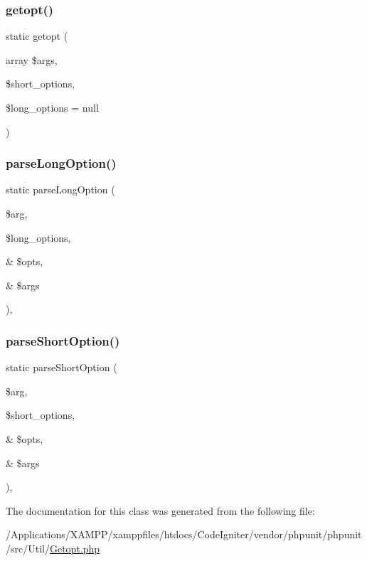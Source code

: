 \subsubsection{\texorpdfstring{getopt()}{getopt()}}
{\footnotesize\ttfamily static getopt (\begin{DoxyParamCaption}\item[{array}]{\$args,  }\item[{}]{\$short\+\_\+options,  }\item[{}]{\$long\+\_\+options = {\ttfamily null} }\end{DoxyParamCaption})\hspace{0.3cm}{\ttfamily [static]}}

\mbox{\label{class_p_h_p_unit___util___getopt_ac4e6c83d1de77c181af5aab31fe548e1}} 
\subsubsection{\texorpdfstring{parse\+Long\+Option()}{parseLongOption()}}
{\footnotesize\ttfamily static parse\+Long\+Option (\begin{DoxyParamCaption}\item[{}]{\$arg,  }\item[{}]{\$long\+\_\+options,  }\item[{\&}]{\$opts,  }\item[{\&}]{\$args }\end{DoxyParamCaption})\hspace{0.3cm}{\ttfamily [static]}, {\ttfamily [protected]}}

\mbox{\label{class_p_h_p_unit___util___getopt_aabde98228d79c9c58761b4730c4b91db}} 
\subsubsection{\texorpdfstring{parse\+Short\+Option()}{parseShortOption()}}
{\footnotesize\ttfamily static parse\+Short\+Option (\begin{DoxyParamCaption}\item[{}]{\$arg,  }\item[{}]{\$short\+\_\+options,  }\item[{\&}]{\$opts,  }\item[{\&}]{\$args }\end{DoxyParamCaption})\hspace{0.3cm}{\ttfamily [static]}, {\ttfamily [protected]}}



The documentation for this class was generated from the following file\+:\begin{DoxyCompactItemize}
\item 
/\+Applications/\+X\+A\+M\+P\+P/xamppfiles/htdocs/\+Code\+Igniter/vendor/phpunit/phpunit/src/\+Util/\mbox{\hyperlink{_getopt_8php}{Getopt.\+php}}\end{DoxyCompactItemize}
